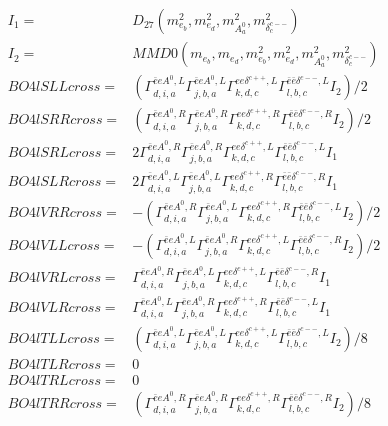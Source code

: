 \documentclass[A4,landscape]{article}
\begin{document}
\begin{align} 
I_1 = & D_{27}(m^2_{e_{{b}}}, m^2_{e_{{d}}}, m^2_{A^0_{{a}}}, m^2_{\delta^{c--}_{{c}}}) \\ 
I_2 = & MMD0(m_{e_{{b}}}, m_{e_{{d}}}, m^2_{e_{{b}}}, m^2_{e_{{d}}}, m^2_{A^0_{{a}}}, m^2_{\delta^{c--}_{{c}}}) \\ 
  BO4lSLLcross= & ( \Gamma^{\bar{e}e A^0 ,L}_{d, i, a} \Gamma^{\bar{e}e A^0 ,L}_{j, b, a} \Gamma^{e e \delta^{c++},L}_{k, d, c} \Gamma^{\bar{e}\bar{e}\delta^{c--} ,L}_{l, b, c} I_2)/2 \\ 
  BO4lSRRcross= & ( \Gamma^{\bar{e}e A^0 ,R}_{d, i, a} \Gamma^{\bar{e}e A^0 ,R}_{j, b, a} \Gamma^{e e \delta^{c++},R}_{k, d, c} \Gamma^{\bar{e}\bar{e}\delta^{c--} ,R}_{l, b, c} I_2)/2 \\ 
  BO4lSRLcross= & 2  \Gamma^{\bar{e}e A^0 ,R}_{d, i, a} \Gamma^{\bar{e}e A^0 ,R}_{j, b, a} \Gamma^{e e \delta^{c++},L}_{k, d, c} \Gamma^{\bar{e}\bar{e}\delta^{c--} ,L}_{l, b, c} I_1 \\ 
  BO4lSLRcross= & 2  \Gamma^{\bar{e}e A^0 ,L}_{d, i, a} \Gamma^{\bar{e}e A^0 ,L}_{j, b, a} \Gamma^{e e \delta^{c++},R}_{k, d, c} \Gamma^{\bar{e}\bar{e}\delta^{c--} ,R}_{l, b, c} I_1 \\ 
  BO4lVRRcross= & -( \Gamma^{\bar{e}e A^0 ,R}_{d, i, a} \Gamma^{\bar{e}e A^0 ,L}_{j, b, a} \Gamma^{e e \delta^{c++},R}_{k, d, c} \Gamma^{\bar{e}\bar{e}\delta^{c--} ,L}_{l, b, c} I_2)/2 \\ 
  BO4lVLLcross= & -( \Gamma^{\bar{e}e A^0 ,L}_{d, i, a} \Gamma^{\bar{e}e A^0 ,R}_{j, b, a} \Gamma^{e e \delta^{c++},L}_{k, d, c} \Gamma^{\bar{e}\bar{e}\delta^{c--} ,R}_{l, b, c} I_2)/2 \\ 
  BO4lVRLcross= &  \Gamma^{\bar{e}e A^0 ,R}_{d, i, a} \Gamma^{\bar{e}e A^0 ,L}_{j, b, a} \Gamma^{e e \delta^{c++},L}_{k, d, c} \Gamma^{\bar{e}\bar{e}\delta^{c--} ,R}_{l, b, c} I_1 \\ 
  BO4lVLRcross= &  \Gamma^{\bar{e}e A^0 ,L}_{d, i, a} \Gamma^{\bar{e}e A^0 ,R}_{j, b, a} \Gamma^{e e \delta^{c++},R}_{k, d, c} \Gamma^{\bar{e}\bar{e}\delta^{c--} ,L}_{l, b, c} I_1 \\ 
  BO4lTLLcross= & ( \Gamma^{\bar{e}e A^0 ,L}_{d, i, a} \Gamma^{\bar{e}e A^0 ,L}_{j, b, a} \Gamma^{e e \delta^{c++},L}_{k, d, c} \Gamma^{\bar{e}\bar{e}\delta^{c--} ,L}_{l, b, c} I_2)/8 \\ 
  BO4lTLRcross= & 0 \\ 
  BO4lTRLcross= & 0 \\ 
  BO4lTRRcross= & ( \Gamma^{\bar{e}e A^0 ,R}_{d, i, a} \Gamma^{\bar{e}e A^0 ,R}_{j, b, a} \Gamma^{e e \delta^{c++},R}_{k, d, c} \Gamma^{\bar{e}\bar{e}\delta^{c--} ,R}_{l, b, c} I_2)/8 \\ 
\end{align} 
\end{document}
